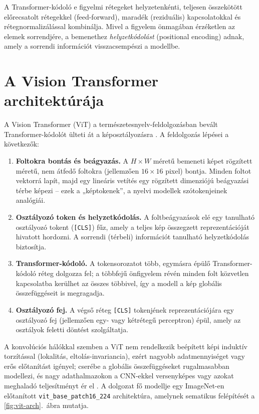 A Transformer-kódoló e figyelmi rétegeket helyzetenkénti, teljesen összekötött
előrecsatolt rétegekkel (feed-forward), maradék (reziduális) kapcsolatokkal és
rétegnormalizálással kombinálja. Mivel a figyelem önmagában érzéketlen az elemek
sorrendjére, a bemenethez \textit{helyzetkódolást} (positional encoding) adnak,
amely a sorrendi információt visszacsempészi a modellbe.

\section{A Vision Transformer architektúrája}

A Vision Transformer (ViT) a természetesnyelv-feldolgozásban bevált
Transformer-kódolót ülteti át a képosztályozásra \cite{dosovitskiy2021vit}. A
feldolgozás lépései a következők:

\begin{enumerate}
  \item \textbf{Foltokra bontás és beágyazás.} A $H \times W$ méretű bemeneti
  képet rögzített méretű, nem átfedő foltokra (jellemzően $16 \times 16$ pixel)
  bontja. Minden foltot vektorrá lapít, majd egy lineáris vetítés egy rögzített
  dimenziójú beágyazási térbe képezi -- ezek a „képtokenek'', a nyelvi modellek
  szótokenjeinek analógiái.
  \item \textbf{Osztályozó token és helyzetkódolás.} A foltbeágyazások elé egy
  tanulható osztályozó tokent (\texttt{[CLS]}) fűz, amely a teljes kép összegzett
  reprezentációját hivatott hordozni. A sorrendi (térbeli) információt tanulható
  helyzetkódolás biztosítja.
  \item \textbf{Transformer-kódoló.} A tokensorozatot több, egymásra épülő
  Transformer-kódoló réteg dolgozza fel; a többfejű önfigyelem révén minden folt
  közvetlen kapcsolatba kerülhet az összes többivel, így a modell a kép globális
  összefüggéseit is megragadja.
  \item \textbf{Osztályozó fej.} A végső réteg \texttt{[CLS]} tokenjének
  reprezentációjára egy osztályozó fej (jellemzően egy- vagy kétrétegű
  perceptron) épül, amely az osztályok feletti döntést szolgáltatja.
\end{enumerate}

A konvolúciós hálókkal szemben a ViT nem rendelkezik beépített képi induktív
torzítással (lokalitás, eltolás-invariancia), ezért nagyobb adatmennyiséget vagy
erős előtanítást igényel; cserébe a globális összefüggéseket rugalmasabban
modellezi, és nagy adathalmazokon a CNN-ekkel versenyképes vagy azokat meghaladó
teljesítményt ér el \cite{dosovitskiy2021vit}. A dolgozat fő modellje egy
ImageNet-en előtanított \texttt{vit\_base\_patch16\_224} architektúra, amelynek
sematikus felépítését a \ref{fig:vit-arch}.~ábra mutatja.


